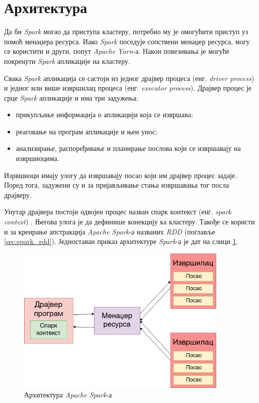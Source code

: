 \documentclass[12pt,oneside]{memoir}
\begin{document}
\section{Архитектура}
\label{sec:spark_arx}

Да би \textit{Spark} могао да приступа кластеру, потребно му је омогућити приступ уз помоћ менаџера ресурса. Иако \textit{Spark} поседује сопствени менаџер ресурса, могу се користити и други, попут \textit{Apache Yarn}-а. Након повезивања је могуће покренути \textit{Spark} апликације на кластеру. 

Свака \textit{Spark} апликација се састоји из једног драјвер процеса (енг. \textit{driver process}) и једног или више извршилац процеса (енг. \textit{executor process}). Драјвер процес је срце \textit{Spark} апликације и има три задужења:

\begin{itemize}
	\item прикупљање информација о апликацији која се извршава;
	\item реаговање на програм апликације и њен унос;
	\item анализирање, распоређивање и планирање послова који се извршавају на извршиоцима.
\end{itemize}

Изрвшиоци имају улогу да извршавају посао који им драјвер процес задаје. Поред тога, задужени су и за пријављивање стања извршавања тог посла драјверу. 

Унутар драјвера постоји одвојен процес назван спарк контекст (енг. \textit{spark context}) \cite{spark_guide}. Његова улога је да дефинише конекцију ка кластеру. Такође се користи и за креирање апстракција \textit{Apache Spark}-а названих \textit{RDD} (поглавље \ref{sec:spark_rdd}). Једноставан приказ архитектуре \textit{Spark}-а је дат на слици \ref{fig:spark_arhtt}.

\begin{figure}[!ht]
  \centering
  \includegraphics[width=0.90\textwidth]{pictures/spark_arch.png}
  \caption{Архитектура \textit{Apache Spark}-а}
  \label{fig:spark_arhtt}
\end{figure}
\end{document}
